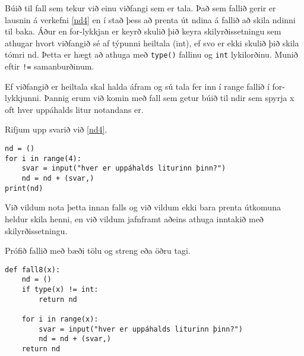 \begin{exercise}\label{fun8}
Búið til fall sem tekur við einu viðfangi sem er tala.
Það sem fallið gerir er lausnin á verkefni \ref{nd4} en í stað þess að prenta út ndina á fallið að skila ndinni til baka.
Áður en for-lykkjan er keyrð skulið þið keyra skilyrðissetningu sem athugar hvort viðfangið sé af týpunni heiltala (int), ef svo er ekki skulið þið skila tómri nd.
Þetta er hægt að athuga með \texttt{type()} fallinu og \texttt{int} lykilorðinu.
Munið eftir \texttt{!=} samanburðinum.

Ef viðfangið er heiltala skal halda áfram og sú tala fer inn í range fallið í for-lykkjunni.
Þannig erum við komin með fall sem getur búið til ndir sem spyrja x oft hver uppáhalds litur notandans er.
\end{exercise}
\begin{Answer}[ref={fun8}]
Rifjum upp svarið við \ref{nd4}.
\begin{lstlisting}
nd = ()
for i in range(4):
	svar = input("hver er uppáhalds liturinn þinn?")
	nd = nd + (svar,)
print(nd)\end{lstlisting}

Við vildum nota þetta innan falls og við vildum ekki bara prenta útkomuna heldur skila henni, en við vildum jafnframt aðeins athuga inntakið með skilyrðissetningu.

Prófið fallið með bæði tölu og streng eða öðru tagi.

\begin{lstlisting}
def fall8(x):
	nd = ()
	if type(x) != int:
		return nd

	for i in range(x):
		svar = input("hver er uppáhalds liturinn þinn?")
		nd = nd + (svar,)
	return nd\end{lstlisting}
\newpage
\end{Answer}

